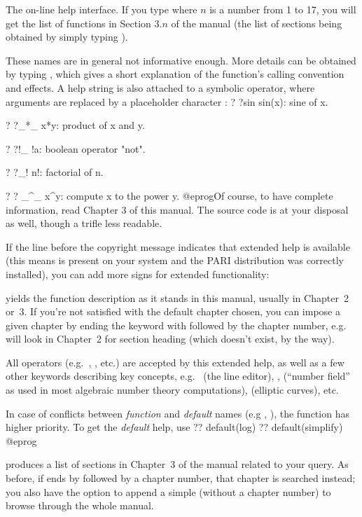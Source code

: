  The  on-line help interface.
If you type  where $n$ is a number from 1 to 17, you will get the
list of functions in Section $3.n$ of the manual (the list of sections being
obtained by simply typing ). \label{se:exthelp}

These names are in general not informative enough. More details can be
obtained by typing , which gives a short explanation of
the function's calling convention and effects. A help string is also attached
to a symbolic operator, where arguments are replaced by a placeholder
character \kbd{\_}:
\bprog
 ?  ?sin
 sin(x): sine of x.

 ?  ?_*_
 x*y: product of x and y.

 ?  ?!_
 !a: boolean operator "not".

 ?  ?_!
 n!: factorial of n.

 ?  ? _^_
 x^y: compute x to the power y.
 @eprog\noindent Of course, to have complete information, read Chapter 3 of
this manual. The source code is at your disposal as well, though a trifle
less readable.

If the line before the copyright message indicates that extended help is
available (this means  is present on your system and the PARI
distribution was correctly installed), you can add more  signs for
extended functionality:

 yields the function description as it stands in this
manual, usually in Chapter~2 or~3. If you're not satisfied with the default
chapter chosen, you can impose a given chapter by ending the keyword with
 followed by the chapter number, e.g.~ will look in
Chapter~2 for section heading  (which doesn't exist, by the way).

All operators (e.g.~\kbd{+}, \kbd{\&\&}, etc.) are accepted by this
extended help, as well as a few other keywords describing key  concepts,
e.g.~ (the line editor), ,  (``number
field'' as used in most algebraic number theory computations), 
(elliptic curves), etc.

In case of conflicts between \emph{function} and \emph{default} names (e.g
, ), the function has higher priority. To get the
\emph{default} help, use
\bprog
  ?? default(log)
  ?? default(simplify)
@eprog

 produces a list of sections in Chapter~3 of the
manual related to your query. As before, if  ends by 
followed by a chapter number, that chapter is searched instead; you also
have the option to append a simple  (without a chapter number) to
browse through the whole manual.

